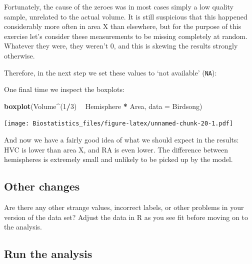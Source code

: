 \documentclass[
]{book}
\newenvironment{Shaded}{\begin{snugshade}}{\end{snugshade}}
\newcommand{\DataTypeTok}[1]{\textcolor[rgb]{0.13,0.29,0.53}{#1}}
\newcommand{\DecValTok}[1]{\textcolor[rgb]{0.00,0.00,0.81}{#1}}
\newcommand{\KeywordTok}[1]{\textcolor[rgb]{0.13,0.29,0.53}{\textbf{#1}}}
\newcommand{\NormalTok}[1]{#1}
\newcommand{\OperatorTok}[1]{\textcolor[rgb]{0.81,0.36,0.00}{\textbf{#1}}}
\newcommand{\OtherTok}[1]{\textcolor[rgb]{0.56,0.35,0.01}{#1}}
\newcommand{\StringTok}[1]{\textcolor[rgb]{0.31,0.60,0.02}{#1}}
\begin{document}
Fortunately, the cause of the zeroes was in most cases simply a low quality sample, unrelated to the actual volume. It is still suspicious that this happened considerably more often in area X than elsewhere, but for the purpose of this exercise let's consider these measurements to be missing completely at random. Whatever they were, they weren't \(0\), and this is skewing the results strongly otherwise.

Therefore, in the next step we set these values to `not available' (\texttt{NA}):

\begin{Shaded}
\end{Shaded}

One final time we inspect the boxplots:

\begin{Shaded}
\begin{Highlighting}[]
\KeywordTok{boxplot}\NormalTok{(Volume}\OperatorTok{^}\NormalTok{(}\DecValTok{1}\OperatorTok{/}\DecValTok{3}\NormalTok{) }\OperatorTok{~}\StringTok{ }\NormalTok{Hemisphere }\OperatorTok{*}\StringTok{ }\NormalTok{Area, }\DataTypeTok{data =}\NormalTok{ Birdsong)}
\end{Highlighting}
\end{Shaded}

\texttt{[image: Biostatistics\_files/figure-latex/unnamed-chunk-20-1.pdf]}

And now we have a fairly good idea of what we should expect in the results: HVC is lower than area X, and RA is even lower. The difference between hemispheres is extremely small and unlikely to be picked up by the model.

\hypertarget{other-changes}{%
\subsection{Other changes}\label{other-changes}}

Are there any other strange values, incorrect labels, or other problems in your version of the data set? Adjust the data in R as you see fit before moving on to the analysis.

\hypertarget{run-the-analysis}{%
\subsection{Run the analysis}\label{run-the-analysis}}
\end{document}
